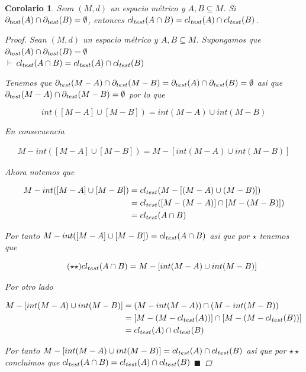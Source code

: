 \documentclass[oneside]{book} %
\theoremstyle{Teorema}
\newtheorem{Corolario}[Definicion]{Corolario}
\theoremstyle{Ejemplos}
\theoremstyle{[Obs]}
\def \test {test}
\newcommand{\cerradura}[2][\test]{\ifx \test #1 {\overline{#2}} \else {cl_{#1}(#2)} \fi} %
\newcommand{\frontera}[2][\test]{\ifx \test #1 {\partial(#2)} \else {\partial_{#1}(#2)} \fi} %
\renewcommand{\{}{\left\lbrace} %
\renewcommand{\}}{\right\rbrace} %
\renewcommand{\u}{\cup} %
\newcommand{\n}{\cap} %
\renewcommand{\sc}{\subseteq} %
\renewcommand{\qed}{$\blacksquare$} %
\newcommand{\pd}{$\vdash\ $} %
\begin{document}
			\begin{Corolario}\setlength{\parindent}{0em}
			
				Sean $(M, d)$ un espacio métrico y $A, B \sc M$. Si $\frontera{A} \n \frontera{B} = \emptyset$, entonces $\cerradura{A \n B} = \cerradura{A} \n \cerradura{B}$.

				\begin{proof}
					
					Sean $(M, d)$ un espacio métrico y $A, B \sc M$. Supongamos que $\frontera{A} \n \frontera{B} = \emptyset$ \\ 
					\pd $\cerradura{A \n B} = \cerradura{A} \n \cerradura{B}$

					Tenemos que $\frontera{M - A} \n \frontera{M - B} = \frontera{A} \n \frontera{B} = \emptyset$ asi que $\frontera{M - A} \n \frontera{M - B} = \emptyset$ por lo que 

					\[ int([M - A] \u [M - B]) = int(M - A) \u int(M - B) \]

					En consecuencia

					\begin{align*}\tag{$\star$}
						M - int([M - A] \u [M - B]) = M - [int(M - A) \u int(M - B)]
					\end{align*}
					
					Ahora notemos que 

					\begin{align*}
						M - int([M - A] \u [M - B]) &= \cerradura{M - [(M - A) \u (M - B)]} \\ 
						&= \cerradura{[M - (M - A)] \n [M - (M - B)]} \\ 
						&= \cerradura{A \n B}
					\end{align*}

					Por tanto $M - int([M - A] \u [M - B]) = \cerradura{A \n B}$ asi que por $\star$ tenemos que 

					\begin{equation*}\tag{$\star\star$}
						\cerradura{A \n B} = M - [int(M - A) \u int(M - B)]
					\end{equation*}

					Por otro lado 

					\begin{align*}
						M - [int(M - A) \u int(M - B)] &= (M - int(M - A)) \n (M - int(M - B)) \\ 
						&= [M - (M - \cerradura{A})] \n [M - (M - \cerradura{B})] \\
						&= \cerradura{A} \n \cerradura{B} 
					\end{align*}

					Por tanto $M - [int(M - A) \u int(M - B)] = \cerradura{A} \n \cerradura{B}$ asi que por $\star\star$ concluimos que $\cerradura{A \n B} = \cerradura{A} \n \cerradura{B}$ \qed

				\end{proof}
			
			\end{Corolario}
\end{document}
